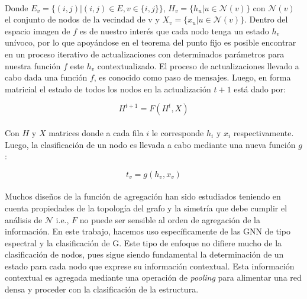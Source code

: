 	\\
	Donde $E_v = \{(i, j)| (i, j) \in E, v \in \{i, j\}\}$,  $H_v = \{h_u| u \in \mathcal{N}(v)\}$ con $\mathcal{N}(v)$ el conjunto de nodos de la vecindad de v y $X_v = \{x_u| u \in \mathcal{N}(v)\}$. Dentro del espacio imagen de $f$ es de nuestro interés que cada nodo tenga un estado $h_v$ unívoco, por lo que apoyándose en el teorema del punto fijo \citep{brown1988fixed} es posible encontrar en un proceso iterativo de actualizaciones con determinados parámetros para nuestra función $f$ este $h_v$ contextualizado. El proceso de actualizaciones llevado a cabo dada una función $f$, es conocido como paso de mensajes. Luego, en forma matricial el estado de todos los nodos en la actualización $t+1$ está dado por:
	
	\begin{equation}
		H^{t+1} = F(H^t, X)
	\end{equation} 
	\\
	Con $H$ y $X$ matrices donde a cada fila $i$ le corresponde $h_i \text{ y } x_i$ respectivamente. Luego, la clasificación de un nodo es llevada a cabo mediante una nueva función $g$:	
	
	\begin{equation}
		t_v = g(h_v, x_v)
	\end{equation}
	\\
	Muchos diseños de la función de agregación han sido estudiados \citep{kipf2017semisupervised} teniendo en cuenta propiedades de la topología del grafo y la simetría que debe cumplir el análisis de $\mathcal{N}$ i.e., $F$ no puede ser sensible al orden de agregación de la información. En este trabajo, hacemos uso específicamente de las GNN de tipo espectral \citep{Wu_2021} y la clasificación de G. Este tipo de enfoque no difiere mucho de la clasificación de nodos, pues sigue siendo fundamental la determinación de un estado para cada nodo que exprese su información contextual. Esta información contextual es agregada mediante una operación de \textit{pooling} para alimentar una red densa y proceder con la clasificación de la estructura.
	
%
%	
